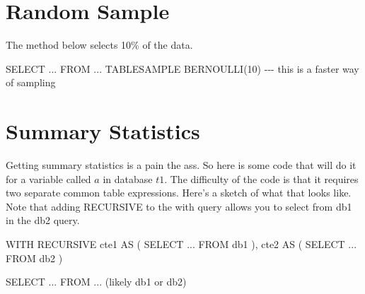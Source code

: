 \documentclass[
  letterpaper,
  DIV=11,
  numbers=noendperiod]{scrreprt}
\newenvironment{Shaded}{\begin{snugshade}}{\end{snugshade}}
\newcommand{\CommentTok}[1]{\textcolor[rgb]{0.37,0.37,0.37}{#1}}
\newcommand{\DecValTok}[1]{\textcolor[rgb]{0.68,0.00,0.00}{#1}}
\newcommand{\KeywordTok}[1]{\textcolor[rgb]{0.00,0.23,0.31}{#1}}
\newcommand{\NormalTok}[1]{\textcolor[rgb]{0.00,0.23,0.31}{#1}}
\newcommand{\OperatorTok}[1]{\textcolor[rgb]{0.37,0.37,0.37}{#1}}
\begin{document}
\hypertarget{random-sample}{%
\section{Random Sample}\label{random-sample}}

The method below selects 10\% of the data.

\begin{Shaded}
\begin{Highlighting}[]
\KeywordTok{SELECT} \OperatorTok{..}\NormalTok{.}
\KeywordTok{FROM} \OperatorTok{..}\NormalTok{.}
\NormalTok{TABLESAMPLE BERNOULLI(}\DecValTok{10}\NormalTok{) }\CommentTok{{-}{-}{-} this is a faster way of sampling}
\end{Highlighting}
\end{Shaded}

\hypertarget{summary-statistics}{%
\section{Summary Statistics}\label{summary-statistics}}

Getting summary statistics is a pain the ass. So here is some code that
will do it for a variable called \(a\) in database \(t1\). The
difficulty of the code is that it requires two separate common table
expressions. Here's a sketch of what that looks like. Note that adding
RECURSIVE to the with query allows you to select from db1 in the db2
query.

\begin{Shaded}
\begin{Highlighting}[]
\KeywordTok{WITH}\NormalTok{ RECURSIVE cte1 }\KeywordTok{AS}\NormalTok{ (}
\KeywordTok{SELECT} \OperatorTok{..}\NormalTok{.}
\KeywordTok{FROM}\NormalTok{ db1}
\NormalTok{),}
\NormalTok{cte2 }\KeywordTok{AS}\NormalTok{ (}
\KeywordTok{SELECT} \OperatorTok{..}\NormalTok{.}
\KeywordTok{FROM}\NormalTok{ db2}
\NormalTok{)}

\KeywordTok{SELECT} \OperatorTok{..}\NormalTok{.}
\KeywordTok{FROM} \OperatorTok{..}\NormalTok{. (likely db1 }\KeywordTok{or}\NormalTok{ db2)}
\end{Highlighting}
\end{Shaded}
\end{document}
